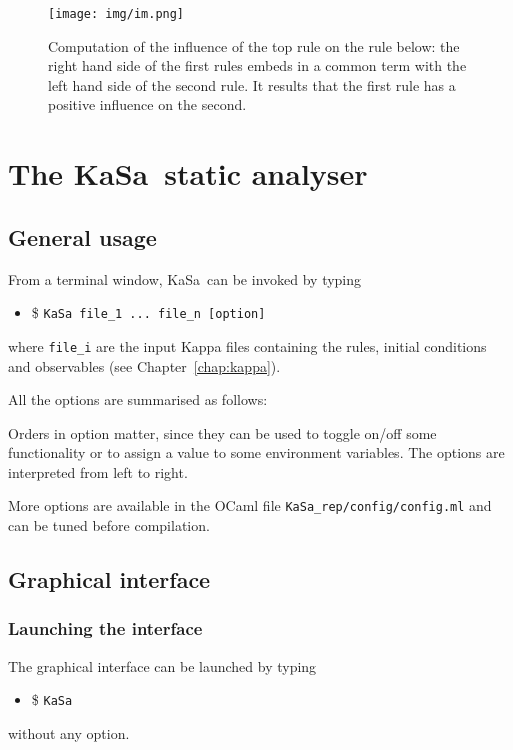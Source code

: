 \documentclass[11pt]{book}
\def\KaSa{\textsf{KaSa}}
\def\ttt#1{\texttt{#1}}
\def\ITE#1{\begin{itemize}#1\end{itemize}}
\begin{document}
\begin{figure}[htbp] %
   \centering
\texttt{[image: img/im.png]}
   \caption{Computation of the influence of the top rule on the rule below: the right hand side of the first rules embeds in a common term with the left hand side of the second rule. It results that the first rule has a positive influence on the second.}
   \label{fig:im}
\end{figure}

\chapter{The \KaSa~static analyser}

\section{General usage}

From a terminal window, \KaSa~can be invoked by typing 
\ITE{
\item[\$] \ttt{KaSa file\_1 ... file\_n  [option]}
}
where \ttt{file\_i} are the input Kappa files containing the rules, initial conditions and observables (see Chapter~\ref{chap:kappa}). 

All the options are summarised as follows: 


Orders in option matter, since they can be used to toggle on/off some functionality or to assign a value to some environment variables. 
The options are interpreted from left to right. 

More options are available in the OCaml file \texttt{KaSa\_rep/config/config.ml} and can be tuned before compilation. 

\section{Graphical interface}

\subsection{Launching the interface}

The graphical interface can be launched by typing 
\ITE{\item[\$] \ttt{KaSa}}

without any option. 
\end{document}
